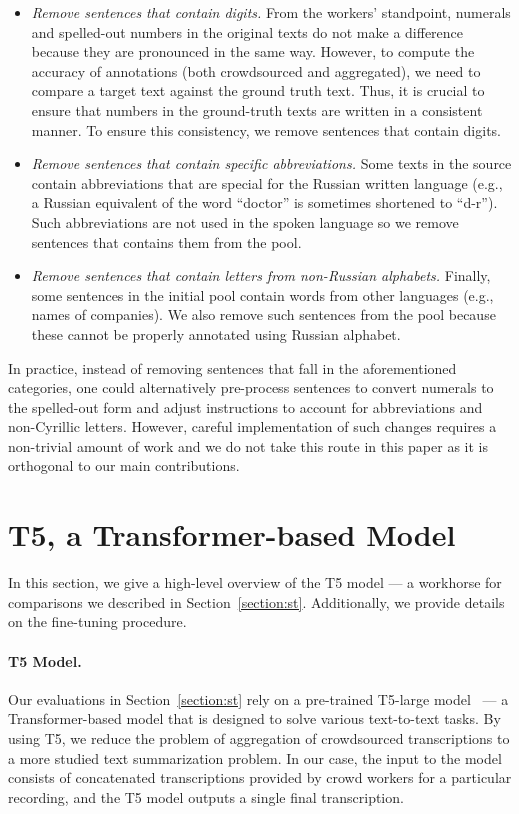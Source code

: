 \documentclass{article}
\begin{document}
\begin{itemize}
  \item \emph{Remove sentences that contain digits.} From the workers' standpoint, numerals and spelled-out numbers in the original texts do not make a difference because they are pronounced in the same way. However, to compute the accuracy of annotations (both crowdsourced and aggregated), we need to compare a target text against the ground truth text. Thus, it is crucial to ensure that numbers in the ground-truth texts are written in a consistent  manner. To ensure this consistency, we remove sentences that contain digits.
  
  \item \emph{Remove sentences that contain specific abbreviations.} Some texts in the source contain abbreviations that are special for the Russian written language (e.g., a Russian equivalent of the word ``doctor'' is sometimes shortened to ``d-r''). Such abbreviations are not used in the spoken language so we remove sentences that contains them from the pool.
  
  \item \emph{Remove sentences that contain letters from non-Russian alphabets.} Finally, some sentences in the initial pool contain words from other languages (e.g., names of companies). We also remove such sentences from the pool because these cannot be properly annotated using Russian alphabet.
  
\end{itemize}

In practice, instead of removing sentences that fall in the aforementioned categories, one could alternatively pre-process sentences to convert numerals to the spelled-out form and adjust instructions to account for abbreviations and non-Cyrillic letters. However, careful implementation of such changes requires a non-trivial amount of work and we do not take this route in this paper as it is orthogonal to our main contributions.


\section{T5, a Transformer-based Model}
\label{section:t5}

In this section, we give a high-level overview of the T5 model --- a workhorse for comparisons we described in Section~\ref{section:st}. Additionally, we provide details on the fine-tuning procedure.

\paragraph{T5 Model.} Our evaluations in Section~\ref{section:st} rely on a pre-trained T5-large model~\citep{JMLR:v21:20-074} --- a Transformer-based model that is designed to solve various text-to-text tasks. By using T5, we reduce the problem of aggregation of crowdsourced transcriptions to a more studied text summarization problem. In our case, the input to the model consists of concatenated transcriptions provided by crowd workers for a particular recording, and the T5 model outputs a single final transcription. 
\end{document}
